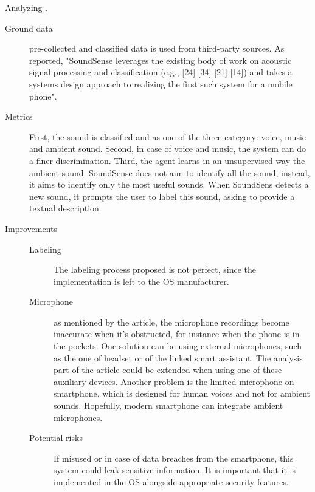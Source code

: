 \documentclass[a4paper, 12pt]{article}
\begin{document}
\begin{exercise}
Analyzing \cite{10.1145/1555816.1555834}.
\begin{description}
    \item[Ground data] pre-collected and classified data is used from third-party
		sources. As reported, "SoundSense leverages the existing body of work on 
		acoustic signal processing and classification (e.g., [24] [34] [21] [14]) 
		and takes a systems design approach to realizing the first such system for 
		a mobile phone".
	\item[Metrics] First, the sound is classified and as one of the three
		category: voice, music and ambient sound. Second, in case of voice and music,
		the system can do a finer discrimination. Third, the agent learns in an
		unsupervised way the ambient sound. 
		SoundSense does not aim to identify all the sound, instead, it aims to
		identify only the most useful sounds.
		When SoundSens detects a new sound, it prompts the user to label this
		sound, asking to provide a textual description.
	\item[Improvements] 
		\begin{description}
			\item[Labeling] The labeling process proposed is not perfect, since 
				the implementation is left to the OS manufacturer.
		    \item[Microphone] as mentioned by the article, the microphone
				recordings become inaccurate when it's obstructed, for instance
				when the phone is in the pockets. One solution can be
				using external microphones, such as the one of headset or of the
				linked smart assistant. The analysis part of the article could
				be extended when using one of these auxiliary devices. Another
				problem is the limited microphone on smartphone, which is
				designed for human voices and not for ambient sounds. Hopefully,
				modern smartphone can integrate ambient microphones. 
			\item[Potential risks] If misused or in case of data breaches from
				the smartphone, this system could leak sensitive information. It
				is important that it is implemented in the OS alongside
				appropriate security features. 
		\end{description}
\end{description}    
\end{exercise}


\medskip

\printbibliography

\doclicenseThis
\end{document}
